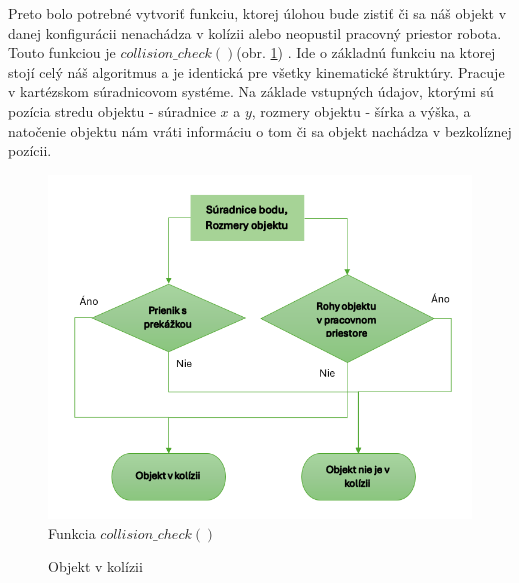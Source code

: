 Preto bolo potrebné vytvoriť funkciu, ktorej úlohou bude zistiť či sa náš objekt v danej konfigurácii nenachádza v kolízii alebo neopustil pracovný priestor robota. Touto funkciou je $ collision\_check() $(obr. \ref{OBRAZOK 4.3}) . Ide o základnú funkciu na ktorej stojí celý náš algoritmus a je identická pre všetky kinematické štruktúry. Pracuje v kartézskom súradnicovom systéme. Na základe vstupných údajov, ktorými sú pozícia stredu objektu - súradnice $ x $ a $ y $, rozmery objektu - šírka a výška, a natočenie objektu nám vráti informáciu o tom či sa objekt nachádza v bezkolíznej pozícii. 
\begin{figure}[h]
	\centering
	\includegraphics[width=130mm]{img/VD_collision.png}
	\caption{ Funkcia $collision\_check()$} \label{OBRAZOK 4.3} 
\end{figure} 

\begin{figure}[h!]
	\centering
	\caption{Objekt v kolízii} \label{OBRAZOK 4.2} 
\end{figure} 

